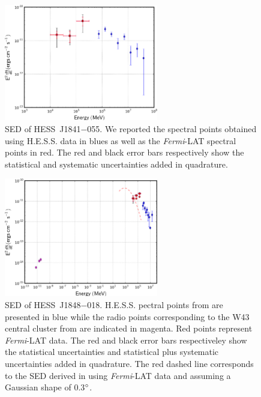 \begin{figure}[h!]
\centering
\includegraphics[width=0.60\textwidth]{figures/HESSJ1841055.eps}
\caption{SED of HESS~J1841$-$055. We reported the spectral points obtained using H.E.S.S. data in blues as well as the \emph{Fermi}-LAT spectral points in red. The red and black error bars respectively show the statistical and systematic uncertainties added in quadrature.
\label{fig:1841}}
\end{figure}

\begin{figure}[h!]
\centering
\includegraphics[width=0.60\textwidth]{figures/HESSJ1848018.eps}
\caption{SED of HESS~J1848$-$018. H.E.S.S. pectral points from \cite{chavesthesis} are presented in blue while the radio points corresponding to the W43 central cluster from \cite{2011AA...532A..92L} are indicated in magenta. Red points represent \emph{Fermi}-LAT data. The red and black error bars respectiveley show the statistical uncertainties and statistical plus systematic uncertainties added in quadrature. The red dashed line corresponds to the SED derived in \cite{2011MmSAI..82..739L} using \emph{Fermi}-LAT data and assuming a Gaussian shape of 0.3$\mbox{$^\circ$}$.
\label{fig:1848}}
\end{figure}

